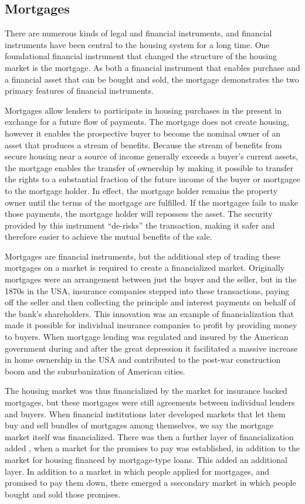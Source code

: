 \subsection{Mortgages}
There are numerous kinds of legal and financial instruments, and financial instruments have been central to the housing system for a long time. One foundational financial instrument that changed the structure of the housing market is the mortgage. As both a financial instrument that enables purchase and a financial asset that can be bought and sold, the mortgage demonstrates the two primary features of financial instruments. 

Mortgages allow lenders to participate in housing purchases in the present in exchange for a future flow of payments. The mortgage does not create housing, however it enables the prospective buyer to become the nominal owner of an asset that produces a stream of benefits. Because the stream of benefits from secure housing near a source of income generally exceeds a buyer's current assets, the mortgage enables the transfer of ownership by making it possible to transfer the rights to a substantial fraction of the future income of the buyer or mortgagee to the mortgage holder. In effect, the mortgage holder remains the property owner until the terms of the mortgage are fulfilled.  If the mortgagee fails to make those payments, the mortgage holder will repossess the asset. The security provided by this instrument ``de-risks'' the transaction, making it safer and therefore easier to achieve the mutual benefits of the sale.

Mortgages are financial instruments, but the additional step of trading these mortgages on a market is required to create a financialized market. Originally mortgages were an arrangement between just the buyer and the seller, but in the 1870s in the USA, insurance companies stepped into these transactions, paying off the seller and then collecting the principle and interest payments on behalf of the bank's shareholders. This innovation was an example of financialization that made it possible for individual insurance companies to profit by providing money to buyers. When mortgage lending was regulated and insured  by the American government during and after the great depression it facilitated a massive increase in home ownership in the USA and contributed to the post-war construction boom and the suburbanization of American cities. 

The housing market was thus financialized by the market for insurance backed mortgages, but these mortgages were still agreements between individual lenders and buyers. When financial institutions later developed markets that let them buy and sell bundles of mortgages among themselves, we say the mortgage market itself was financialized. There was then a further layer of financialization added %
, when a market for the promises to pay was established, in addition to the market for housing financed by mortgage-type loans. This added an additional layer. In addition to a market in which people applied for mortgages, and promised to pay them down, there emerged a ssecondary market in which people bought and sold those promises. %

